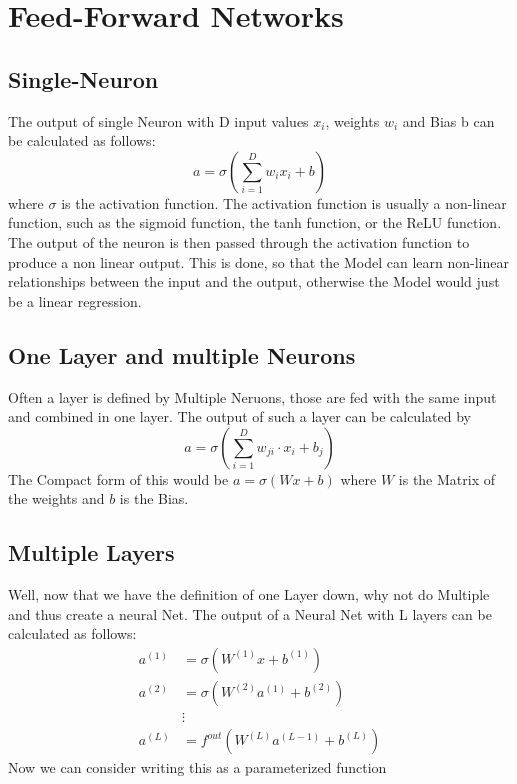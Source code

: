 \documentclass[a4paper]{article}
\begin{document}
    \section{Feed-Forward Networks}

    \subsection{Single-Neuron}

    The output of  single Neuron with D input values $x_{i}$, weights $w_{i}$ and Bias b can be calculated as follows: $$a = \sigma(\sum_{i=1}^{D} w_{i}x_{i} + b)$$ where $\sigma$ is the activation function. The activation function is usually a non-linear function, such as the sigmoid function, the tanh function, or the ReLU function. The output of the neuron is then passed through the activation function to produce a non linear output. This is done, so that the Model can learn non-linear relationships between the input and the output, otherwise the Model would just be a linear regression.

    \subsection{One Layer and multiple Neurons}
    Often a layer is defined by Multiple Neruons, those are fed with the same input and combined in one layer. The output of such a layer can be calculated by $$a = \sigma(\sum_{i=1}^{D}w_{ji} \cdot x_{i} + b_{j})$$ The Compact form of this would be $a = \sigma(Wx + b)$ where $W$ is the Matrix of the weights and $b$ is the Bias.


    \subsection{Multiple Layers}

    Well, now that we have the definition of one Layer down, why not do Multiple and thus create a neural Net. The output of a Neural Net with L layers can be calculated as follows: \begin{align*}
        a^{(1)} &= \sigma(W^{(1)}x + b^{(1)}) \\
        a^{(2)} &= \sigma(W^{(2)}a^{(1)} + b^{(2)}) \\
        &\vdots \\
        a^{(L)} &= f^{out} (W^{(L)}a^{(L-1)} + b^{(L)})
    \end{align*}
    Now we can consider writing this as a parameterized function
  
\end{document}
